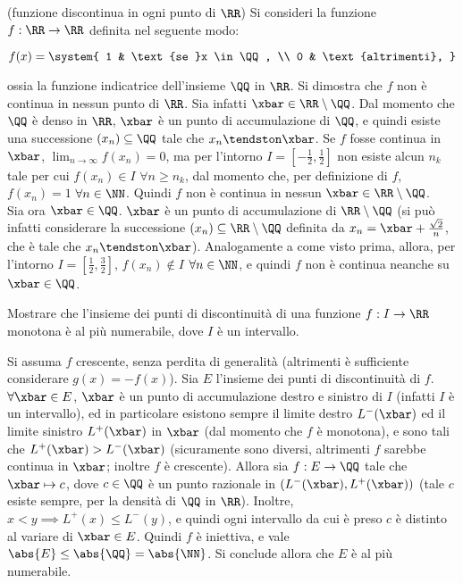 \documentclass[11pt]{article}
\begin{document}

	\begin{example} (funzione discontinua in ogni punto di $\RR$) Si consideri la funzione $f : \RR \to \RR$ definita
		nel seguente modo:
	
		\[ f(x) = \system{ 1 & \text{se }x \in \QQ, \\ 0 & \text{altrimenti}, } \]
		
		\vskip 0.05in
		
		ossia la funzione indicatrice dell'insieme $\QQ$ in $\RR$. Si dimostra che $f$ non è continua
		in nessun punto di $\RR$. Sia infatti $\xbar \in \RR \setminus \QQ$. Dal momento che $\QQ$ è denso
		in $\RR$, $\xbar$ è un punto di accumulazione di $\QQ$, e quindi esiste una successione $(x_n) \subseteq \QQ$
		tale che $x_n \tendston \xbar$. Se $f$ fosse continua in $\xbar$, $\lim_{n \to \infty} f(x_n) = 0$,
		ma per l'intorno $I = [-\frac{1}{2}, \frac{1}{2}]$ non esiste alcun $n_k$ tale per cui $f(x_n) \in I$ $\forall n
		\geq n_k$, dal momento che, per definizione di $f$, $f(x_n) = 1$ $\forall n \in \NN$. Quindi $f$ non è continua
		in nessun $\xbar \in \RR \setminus \QQ$. \\
		
		Sia ora $\xbar \in \QQ$. $\xbar$ è un punto di accumulazione di $\RR \setminus \QQ$ (si può infatti
		considerare la successione $(x_n) \subseteq \RR \setminus \QQ$ definita da $x_n = \xbar + \frac{\sqrt{2}}{n}$,
		che è tale che $x_n \tendston \xbar$). Analogamente a come visto prima, allora, per l'intorno $I = [\frac{1}{2}, \frac{3}{2}]$, $f(x_n) \notin I$ $\forall n \in \NN$, e quindi $f$ non è continua neanche su $\xbar \in \QQ$.
	\end{example}

	\begin{exercise}
		Mostrare che l'insieme dei punti di discontinuità di una funzione $f : I \to \RR$ monotona è al più
		numerabile, dove $I$ è un intervallo.
	\end{exercise}

	\begin{solution}
		Si assuma $f$ crescente, senza perdita di generalità (altrimenti è sufficiente considerare $g(x) = -f(x)$).
		Sia $E$ l'insieme dei punti di discontinuità di $f$. $\forall \xbar \in E$, $\xbar$ è un punto di accumulazione
		destro e sinistro di $I$ (infatti $I$ è un intervallo), ed in particolare esistono sempre il limite destro $L^-(\xbar)$
		ed il limite sinistro $L^+(\xbar)$ in $\xbar$ (dal momento che $f$ è monotona), e sono tali che $L^+(\xbar) > L^-(\xbar)$ (sicuramente
		sono diversi, altrimenti
		$f$ sarebbe continua in $\xbar$; inoltre $f$ è crescente). Allora sia $f : E \to \QQ$ tale che $\xbar \mapsto c$, dove $c \in \QQ$ è
		un punto razionale in $(L^-(\xbar), L^+(\xbar))$ (tale $c$ esiste sempre, per la densità di $\QQ$ in $\RR$).
		Inoltre, $x < y \implies L^+(x) \leq L^-(y)$, e quindi ogni intervallo da cui è preso $c$ è distinto al variare
		di $\xbar \in E$. Quindi $f$ è iniettiva, e vale $\abs{E} \leq \abs{\QQ} = \abs{\NN}$. Si conclude allora
		che $E$ è al più numerabile.
	\end{solution}
	
\end{document}
